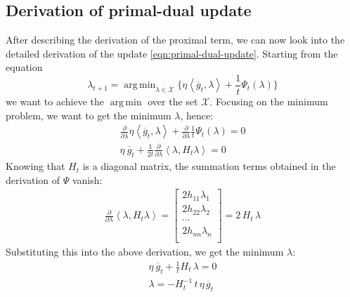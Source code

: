 \documentclass[notitlepage]{article}
\DeclareMathOperator*{\argmin}{arg\,min}
\begin{document}
\subsection{Derivation of primal-dual update}
After describing the derivation of the proximal term, we can now look into the detailed derivation of the update \eqref{eqn:primal-dual-update}. Starting from the equation
\[
  \lambda_{t+1} = \argmin_{\lambda \in \mathcal{X}} \{ \eta \left\langle \overline{g}_t,\lambda \right\rangle + \frac{1}{t} \Psi_t(\lambda) \} 
\]
we want to achieve the $\argmin$ over the set $\mathcal{X}$. Focusing on the minimum problem, we want to get the minimum $\lambda$, hence:
\begin{align*}
  \frac{\partial}{\partial \lambda} \eta \left\langle \overline{g}_t,\lambda \right\rangle + \frac{\partial}{\partial \lambda} \frac{1}{t} \Psi_t(\lambda) = 0 \\
  \eta\ \overline{g}_t + \frac{1}{2t} \frac{\partial}{\partial \lambda} \left\langle \lambda,H_t \lambda \right\rangle = 0 
\end{align*}  
Knowing that $H_t$ is a diagonal matrix, the summation terms obtained in the derivation of $\Psi$ vanish:
\begin{align*}
  \frac{\partial}{\partial \lambda} \left\langle \lambda, H_t \lambda \right\rangle =
  \begin{bmatrix}
    2 h_{11} \lambda_1 \\[2ex]
    2 h_{22} \lambda_2 \\[2ex]
    \cdots \\[2ex]
    2 h_{nn} \lambda_n \\
  \end{bmatrix}
  = 2\, H_t\, \lambda
\end{align*}
Substituting this into the above derivation, we get the minimum $\lambda$:
\begin{align*}
  \eta\ \overline{g}_t + \frac{1}{t} H_t\, \lambda = 0 \\
  \lambda = - H_t^{-1}\, t\, \eta\, \overline{g}_t
\end{align*}
\end{document}
